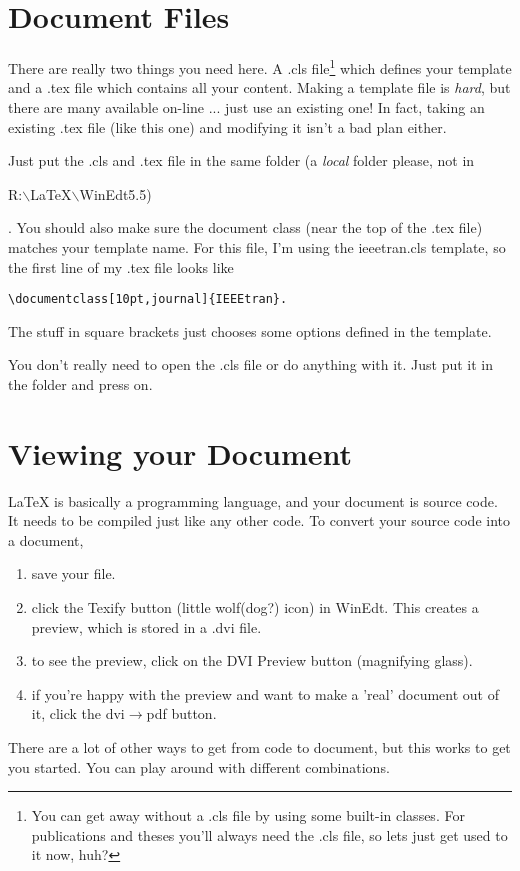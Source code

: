 \documentclass[10pt,journal]{ieeetran}
\begin{document}
\section{Document Files}
There are really two things you need here.  A .cls
file\footnote{You can get away without a .cls file by using some
built-in classes.  For publications and theses you'll always need
the .cls file, so lets just get used to it now, huh?} which
defines your template and a .tex file which contains all your
content.  Making a template file is \emph{hard}, but there are
many available on-line ... just use an existing one!  In fact,
taking an existing .tex file (like this one) and modifying it
isn't a bad plan either.

Just put the .cls and .tex file in the same folder (a \emph{local}
folder please, not in
\begin{ttfamily}R:$\backslash$LaTeX$\backslash$WinEdt5.5)\end{ttfamily}. You
should also make sure the document class (near the top of the .tex
file) matches your template name. For this file, I'm using the
ieeetran.cls template, so the first line of my .tex file looks
like
\begin{verbatim}\documentclass[10pt,journal]{IEEEtran}.\end{verbatim}
The stuff in square brackets just chooses some options defined in
the template.

You don't really need to open the .cls file or do anything with
it.  Just put it in the folder and press on.

\section{Viewing your Document}
LaTeX is basically a programming language, and your document is
source code.  It needs to be compiled just like any other code. To
convert your source code into a document,
\begin{enumerate}
    \item save your file.
    \item click the Texify button (little wolf(dog?) icon) in
        WinEdt. This creates a preview, which is stored in a
        .dvi file.
    \item to see the preview, click on the DVI Preview button
        (magnifying glass).
    \item if you're happy with the preview and want to make a
        'real' document out of it, click the
        dvi$\rightarrow$pdf button.
\end{enumerate}
There are a lot of other ways to get from code to document, but
this works to get you started.  You can play around with different
combinations.
\end{document}
